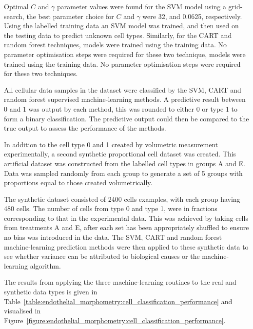 Optimal $C$ and $\gamma$ parameter values were found for the SVM model using a grid-search, the best parameter choice for $C$ and $\gamma$ were 32, and 0.0625, respectively. Using the labelled training data an SVM model was trained, and then used on the testing data to predict unknown cell types. Similarly, for the CART and random forest techniques, models were trained using the training data. No parameter optimisation steps were required for these two technique, models were trained using the training data. No parameter optimisation steps were required for these two techniques.

All cellular data samples in the dataset were classified by the SVM, CART and random forest supervised machine-learning methods. A predictive result between 0 and 1 was output by each method, this was rounded to either 0 or type 1 to form a binary classification. The predictive output could then be compared to the true output to assess the performance of the methods.

In addition to the cell type 0 and 1 created by volumetric measurement experimentally, a second synthetic proportional cell dataset was created. This artificial dataset was constructed from the labelled cell types in groups A and E. Data was sampled randomly from each group to generate a set of 5 groups with proportions equal to those created volumetrically.

The synthetic dataset consisted of 2400 cells examples, with each group having 480 cells. The number of cells from type 0 and type 1, were in fractions corresponding to that in the experimental data. This was achieved by taking cells from treatments A and E, after each set has been appropriately shuffled to ensure no bias was introduced in the data. The SVM, CART and random forest machine-learning prediction methods were then applied to these synthetic data to see whether variance can be attributed to biological causes or the machine-learning algorithm.

The results from applying the three machine-learning routines to the real and synthetic data types is given in Table~\ref{table:endothelial_morphometry:cell_classification_performance} and visualised in Figure~\ref{figure:endothelial_morphometry:cell_classification_performance}.

